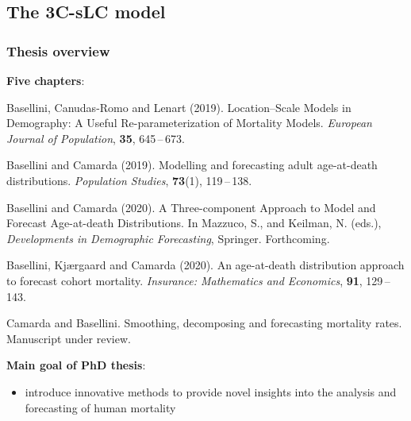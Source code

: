 \documentclass[12pt, xcolor=table]{beamer}  %
\begin{document}
\subsection{The 3C-sLC model}
\begin{frame}[plain]\frametitle{Thesis overview}
	\textbf{Five chapters}: 
	\begin{itemize}
		\scriptsize	
		\item { Basellini, Canudas-Romo and Lenart (2019). Location--Scale Models in Demography: A Useful Re-parameterization of Mortality Models. {\it European Journal of Population}, {\bf 35}, 645\,--\,673. 	
			
		\item  Basellini and Camarda (2019). Modelling and forecasting adult age-at-death distributions. {\it Population Studies}, {\bf 73}(1), 119\,--\,138. 
			
		\item  Basellini and Camarda (2020). A Three-component Approach to Model and Forecast Age-at-death Distributions. In Mazzuco, S., and Keilman, N. (eds.), {\it Developments in Demographic Forecasting}, Springer. Forthcoming. 
		
		\item Basellini, Kj{\ae}rgaard and Camarda (2020). An age-at-death distribution approach \\ to forecast cohort mortality. {\it Insurance: Mathematics and Economics}, {\bf 91}, 129\,--\,143. }	
		
		\item {  Camarda and Basellini. Smoothing, decomposing and forecasting mortality rates. Manuscript under review. }	
	\end{itemize}
	\bigskip
	{\pgfsetfillopacity{1} 
		\textbf{Main goal of PhD thesis}: 
		\begin{itemize}
			\item introduce innovative methods to provide novel insights into the analysis and forecasting of human mortality	
		\end{itemize}
	}
\end{frame}
\end{document}
